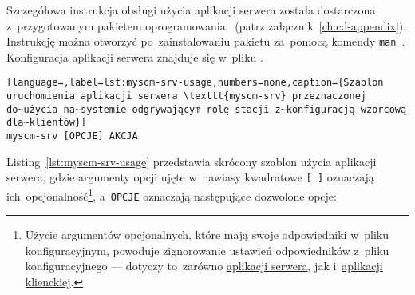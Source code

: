 \documentclass[thesis]{subfiles}
\begin{document}
Szczegółowa instrukcja obsługi użycia aplikacji serwera została dostarczona z~przygotowanym pakietem oprogramowania \texttt{\srvappname{}}~(patrz załącznik~\ref{ch:cd-appendix}). Instrukcję można otworzyć po~zainstalowaniu pakietu \texttt{\srvappname{}} za~pomocą komendy \texttt{man~\srvappname{}}. Konfiguracja aplikacji serwera znajduje się w~pliku \myscmsrvconfig{}.

\begin{lstlisting}[language=,label=lst:myscm-srv-usage,numbers=none,caption={Szablon uruchomienia aplikacji serwera \texttt{myscm-srv} przeznaczonej do~użycia na~systemie odgrywającym rolę stacji z~konfiguracją wzorcową dla~klientów}]
myscm-srv [OPCJE] AKCJA
\end{lstlisting}

Listing~\ref{lst:myscm-srv-usage} przedstawia skrócony szablon użycia aplikacji serwera, gdzie argumenty opcji ujęte w~nawiasy kwadratowe \texttt{[~]} oznaczają ich~opcjonalność\footnote{Użycie argumentów opcjonalnych, które mają swoje odpowiedniki w~pliku konfiguracyjnym, powoduje zignorowanie ustawień odpowiedników z~pliku konfiguracyjnego --- dotyczy to~zarówno \hyperref[sec:srv-app]{aplikacji serwera}, jak i~\hyperref[sec:cli-app]{aplikacji klienckiej}.}, a~\texttt{OPCJE} oznaczają następujące dozwolone opcje:\mynobreakpar
\end{document}
